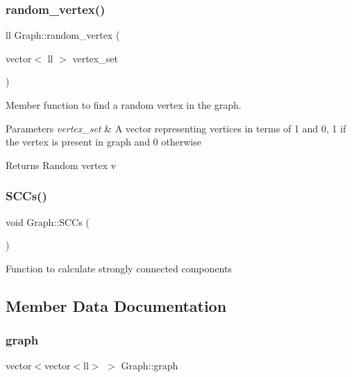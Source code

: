 \subsubsection{\texorpdfstring{random\+\_\+vertex()}{random\_vertex()}}
{\footnotesize\ttfamily ll Graph\+::random\+\_\+vertex (\begin{DoxyParamCaption}\item[{vector$<$ ll $>$}]{vertex\+\_\+set }\end{DoxyParamCaption})\hspace{0.3cm}{\ttfamily [inline]}}



Member function to find a random vertex in the graph. 


\begin{DoxyParams}{Parameters}
{\em vertex\+\_\+set} & A vector representing vertices in terms of 1 and 0, 1 if the vertex is present in graph and 0 otherwise \\
\hline
\end{DoxyParams}
\begin{DoxyReturn}{Returns}
Random vertex v 
\end{DoxyReturn}
\mbox{\label{classGraph_a985f12be7d4281d54d61cba720894e58}} 
\subsubsection{\texorpdfstring{S\+C\+Cs()}{SCCs()}}
{\footnotesize\ttfamily void Graph\+::\+S\+C\+Cs (\begin{DoxyParamCaption}{ }\end{DoxyParamCaption})}

Function to calculate strongly connected components 

\subsection{Member Data Documentation}
\mbox{\label{classGraph_ab8435b2eb808e20c78688da1818a3a8a}} 
\subsubsection{\texorpdfstring{graph}{graph}}
{\footnotesize\ttfamily vector$<$vector$<$ll$>$ $>$ Graph\+::graph}

